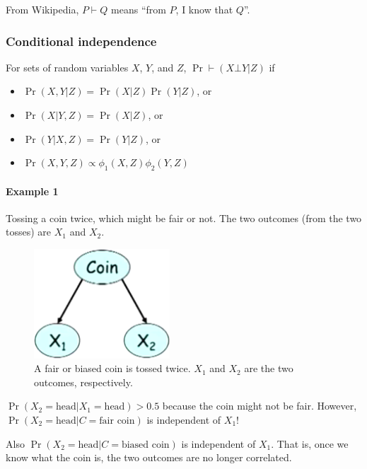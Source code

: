 \documentclass[12pt]{article}
\begin{document}
From Wikipedia, $P \vdash Q$ means ``from $P$, I know that $Q$''.

\subsubsection{Conditional independence}
For sets of random variables $X$, $Y$, and $Z$, $\Pr \vdash (X \bot Y | Z)$ if

\begin{itemize}
  \item $\Pr(X, Y|Z) = \Pr(X|Z) \Pr(Y|Z)$, or

  \item $\Pr(X|Y, Z) = \Pr(X|Z)$, or

  \item $\Pr(Y|X, Z) = \Pr(Y|Z)$, or

  \item $\Pr(X, Y, Z) \propto \phi_1(X, Z) \phi_2(Y, Z) $
\end{itemize}



\paragraph{Example 1}  Tossing a coin twice, which might be fair or not. The two outcomes (from the two tosses) are $X_1$ and $X_2$.

\begin{figure}[H]
\centering
\includegraphics[width=2in]{graphics/example_coin.png}
\caption{A fair or biased coin is tossed twice. $X_1$ and $X_2$ are the two outcomes, respectively.}
\label{fig:example_coin}
\end{figure}


$\Pr(X_2 = \text{head} | X_1 = \text{head}) > 0.5$ because the coin might not be fair.
However, $\Pr(X_2 = \text{head}| C = \text{fair coin})$ is independent of $X_1$!

Also $\Pr(X_2 = \text{head}| C = \text{biased coin})$ is independent of $X_1$. That is, once we know what the coin is, the two outcomes are no longer correlated.
\end{document}
